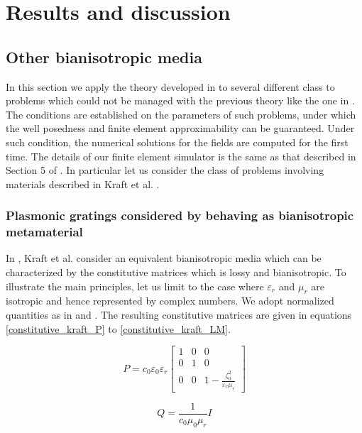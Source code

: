 \section{Results and discussion} \subsection{Other bianisotropic media} 
In this section we apply the theory developed in \cite{kalarickel2020well} to 
several different class to problems which could not be managed with the 
previous theory like the one in \cite{bianisotropi_m3as}.
The conditions are established on the parameters of such problems, 
under which the well posedness and finite element 
approximability  can be guaranteed.
Under such condition, the numerical solutions for the fields are 
computed for the first time.
The details of our finite element simulator is the same as that 
described in Section 5 of \cite{kalarickel2020well}.
In particular let us consider the class of problems involving materials described in Kraft et al. \cite{pendry2016acsphotonics}.

\subsubsection{Plasmonic gratings considered by \cite{pendry2016acsphotonics} behaving as bianisotropic metamaterial}

In \cite{pendry2016acsphotonics}, Kraft et al. consider an equivalent bianisotropic media which can be characterized by
the constitutive matrices which is lossy and bianisotropic.
To illustrate the main principles, let us limit to the case 
where $\varepsilon_r$ and $\mu_r$ are isotropic and hence represented by complex numbers.
We adopt normalized quantities as in \cite{chen2005retrieval} and \cite{li2009determination}. 
The resulting constitutive matrices are given in equations  \ref{constitutive_kraft_P} to \ref{constitutive_kraft_LM}. 

\begin{equation}  \label{constitutive_kraft_P}
\tag{70}
P = c_0 \varepsilon_0 \varepsilon_r
\begin{bmatrix}
1 & 0 & 0 \\
0 &  1 & 0 \\
0 & 0 & 1-\frac{\zeta_0^2}{\varepsilon_r\mu_r}
\end{bmatrix} 
\end{equation}


\begin{equation} \label{constitutive_kraft_Q}
\tag{71}
Q = \frac{1}{c_0\mu_0\mu_r}I
\end{equation}

